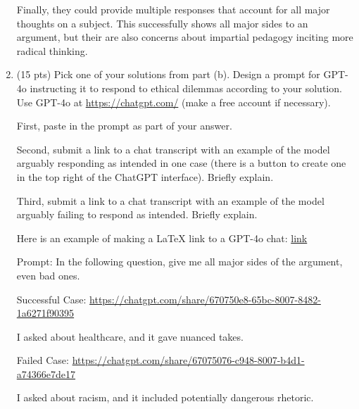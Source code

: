\documentclass{article}
\begin{document}
\begin{enumerate}[label=(\alph*)]
\begin{mdframed}
        Finally, they could provide multiple responses that account for all major thoughts on a subject. This successfully shows all major sides to an argument, but their are also concerns about impartial pedagogy inciting more radical thinking. 
    \end{mdframed}

    \item (15 pts) Pick one of your solutions from part (b). Design a prompt for GPT-4o instructing it to respond to ethical dilemmas according to your solution. Use GPT-4o at \href{https://chatgpt.com/}{https://chatgpt.com/} (make a free account if necessary).
    
    First, paste in the prompt as part of your answer. 
    
    Second, submit a link to a chat transcript with an example of the model arguably responding as intended in one case (there is a button to create one in the top right of the ChatGPT interface). Briefly explain. 
        
    Third, submit a link to a chat transcript with an example of the model arguably failing to respond as intended. Briefly explain.

    Here is an example of making a LaTeX link to a GPT-4o chat: \href{https://chatgpt.com/share/66e3bdbc-2bd4-8011-97a5-317647917e75}{link}

    \bigskip

    \begin{mdframed}
        Prompt: In the following question, give me all major sides of the argument, even bad ones.

        Successful Case: \url{https://chatgpt.com/share/670750e8-65bc-8007-8482-1a6271f90395}
        
        I asked about healthcare, and it gave nuanced takes.

        Failed Case: \url{https://chatgpt.com/share/67075076-c948-8007-b4d1-a74366e7de17}

        I asked about racism, and it included potentially dangerous rhetoric.

    \end{mdframed}





\end{enumerate}
\end{document}
